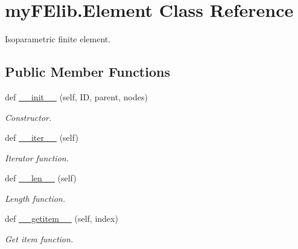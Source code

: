 \hypertarget{classmyFElib_1_1Element}{}\section{my\+F\+Elib.\+Element Class Reference}
\label{classmyFElib_1_1Element}


Isoparametric finite element.  


\subsection*{Public Member Functions}
\begin{DoxyCompactItemize}
\item 
def \mbox{\hyperlink{classmyFElib_1_1Element_a3438d88703cd27b7f5d71dadebfa1e68}{\+\_\+\+\_\+init\+\_\+\+\_\+}} (self, ID, parent, nodes)
\begin{DoxyCompactList}\small\item\em Constructor. \end{DoxyCompactList}\item 
\mbox{\label{classmyFElib_1_1Element_a85213fd3dd60e6e8b0e19c224d9870be}} 
def \mbox{\hyperlink{classmyFElib_1_1Element_a85213fd3dd60e6e8b0e19c224d9870be}{\+\_\+\+\_\+iter\+\_\+\+\_\+}} (self)
\begin{DoxyCompactList}\small\item\em Iterator function. \end{DoxyCompactList}\item 
\mbox{\label{classmyFElib_1_1Element_a55a63ea04373ed1c188319f65cfafcbf}} 
def \mbox{\hyperlink{classmyFElib_1_1Element_a55a63ea04373ed1c188319f65cfafcbf}{\+\_\+\+\_\+len\+\_\+\+\_\+}} (self)
\begin{DoxyCompactList}\small\item\em Length function. \end{DoxyCompactList}\item 
\mbox{\label{classmyFElib_1_1Element_ae75da712a4c09df15479d13e6a950c62}} 
def \mbox{\hyperlink{classmyFElib_1_1Element_ae75da712a4c09df15479d13e6a950c62}{\+\_\+\+\_\+getitem\+\_\+\+\_\+}} (self, index)
\begin{DoxyCompactList}\small\item\em Get item function. \end{DoxyCompactList}\item 

\end{DoxyCompactItemize}
